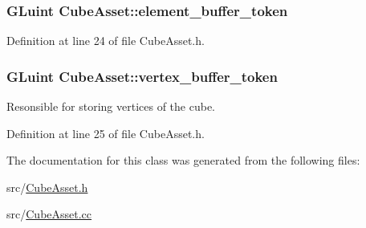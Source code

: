 \subsubsection[{element\+\_\+buffer\+\_\+token}]{\setlength{\rightskip}{0pt plus 5cm}G\+Luint Cube\+Asset\+::element\+\_\+buffer\+\_\+token\hspace{0.3cm}{\ttfamily [private]}}\label{class_cube_asset_a4fae699256e7c5633a8174a93ca8a0ec}


Definition at line 24 of file Cube\+Asset.\+h.

\hypertarget{class_cube_asset_a31bd098f60e2c24988316a9cc9335987}{}
\subsubsection[{vertex\+\_\+buffer\+\_\+token}]{\setlength{\rightskip}{0pt plus 5cm}G\+Luint Cube\+Asset\+::vertex\+\_\+buffer\+\_\+token\hspace{0.3cm}{\ttfamily [private]}}\label{class_cube_asset_a31bd098f60e2c24988316a9cc9335987}
Resonsible for storing vertices of the cube. 

Definition at line 25 of file Cube\+Asset.\+h.



The documentation for this class was generated from the following files\+:\begin{DoxyCompactItemize}
\item 
src/\hyperlink{_cube_asset_8h}{Cube\+Asset.\+h}\item 
src/\hyperlink{_cube_asset_8cc}{Cube\+Asset.\+cc}\end{DoxyCompactItemize}
